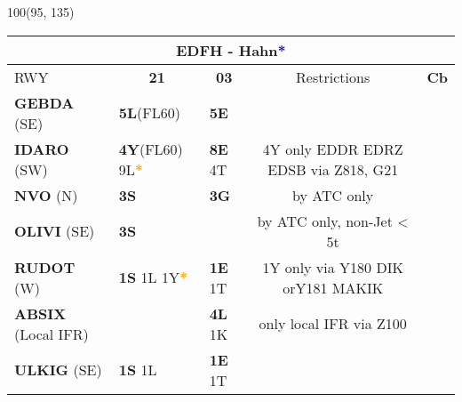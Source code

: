 \documentclass[10pt,landscape,a4paper]{article}
\begin{document}
\begin{textblock}{100}(95, 135)
\begin{table}[]
\begin{tabular}{|llllll}
\multicolumn{6}{c}{\textbf{EDFH - Hahn\textcolor{blue}{*}}} \\ \hline
\multicolumn{1}{|l|}{RWY} 									& \multicolumn{1}{c|}{\textbf{21}} 			& \multicolumn{1}{c|}{\textbf{03}}  				& \multicolumn{2}{c|}{Restrictions} 				& \multicolumn{1}{c|}{\textbf{Cb}} 							\\ \hline
\multicolumn{1}{|l|}{\textbf{GEBDA} (SE)}							& \multicolumn{1}{l|}{\textbf{5L}(FL60)}			& \multicolumn{1}{l|}{\textbf{5E}} 				& \multicolumn{2}{c|}{}						& \multicolumn{1}{c|}{\multirow{7}{*}{\rotatebox{90}{5000ft}}}			 \\ \cline{1-5}
\multicolumn{1}{|l|}{\textbf{IDARO} (SW)}							& \multicolumn{1}{l|}{\textbf{4Y}(FL60) 9L\textbf{\textcolor{orange}{*}}}	& \multicolumn{1}{l|}{\textbf{ 8E} 4T}	& \multicolumn{2}{c|}{4Y only EDDR EDRZ EDSB  via Z818, G21}  & \multicolumn{1}{c|}{}								\\ \cline{1-5}

\multicolumn{1}{|l|}{\textbf{NVO} (N)} 								& \multicolumn{1}{l|}{\textbf{3S}} 			& \multicolumn{1}{l|}{\textbf{3G}}				& \multicolumn{2}{c|}{by ATC only} 				& \multicolumn{1}{c|}{} 									\\ \cline{1-5}
\multicolumn{1}{|l|}{\textbf{OLIVI} (SE)}							& \multicolumn{1}{l|}{\textbf{3S}}			& \multicolumn{1}{l|}{}						& \multicolumn{2}{c|}{by ATC only, non-Jet < 5t} 		& \multicolumn{1}{c|}{}									\\ \cline{1-5} 

\multicolumn{1}{|l|}{\textbf{RUDOT} (W)} 							& \multicolumn{1}{l|}{\textbf{1S} 1L 1Y\textbf{\textcolor{orange}{*}}}& \multicolumn{1}{l|}{\textbf{1E} 1T}	& \multicolumn{2}{c|}{1Y only via Y180 DIK orY181 MAKIK}	& \multicolumn{1}{c|}{}			 						\\\cline{1-5} 
\multicolumn{1}{|l|}{\textbf{ABSIX} (Local IFR)} 						& \multicolumn{1}{l|}{}					& \multicolumn{1}{l|}{\textbf{4L} 1K}				& \multicolumn{2}{c|}{only local IFR  via Z100}		& \multicolumn{1}{c|}{}									\\\cline{1-5} 
\multicolumn{1}{|l|}{\textbf{ULKIG} (SE)} 							& \multicolumn{1}{l|}{\textbf{1S} 1L} 			& \multicolumn{1}{l|}{\textbf{1E} 1T}				& \multicolumn{2}{c|}{}  						& \multicolumn{1}{c|}{}									\\ \hline
\end{tabular}
\end{table}
\end{textblock}
\end{document}
